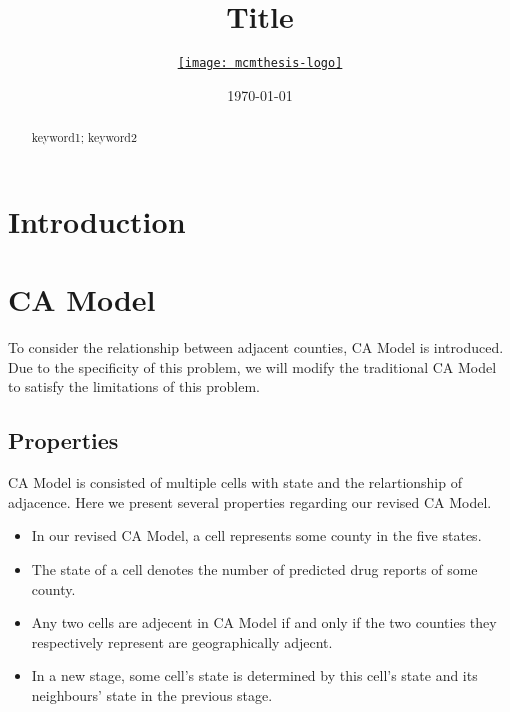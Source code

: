 \documentclass{mcmthesis}
\title{Title}
\author{\small \href{http://www.latexstudio.net/}
  {\texttt{[image: mcmthesis-logo]}}}
\date{\today}
\begin{document}
\begin{abstract}
\begin{keywords}
keyword1; keyword2
\end{keywords}
\end{abstract}
\maketitle

\tableofcontents

\newpage

\section{Introduction}



\section{CA Model}

To consider the relationship between adjacent counties, CA Model is introduced. Due to the specificity of this problem, we will modify the traditional CA Model to satisfy the limitations of this problem. \par


\subsection{Properties} %

CA Model is consisted of multiple cells with state and the relartionship of adjacence. Here we present several properties regarding our revised CA Model. 

\begin{itemize}
\item In our revised CA Model, a cell represents some county in the five states.
\item The state of a cell denotes the number of predicted drug reports of some county.
\item Any two cells are adjecent in CA Model if and only if the two counties they respectively represent are geographically adjecnt.
\item In a new stage, some cell's state is determined by this cell's state and its neighbours' state in the previous stage.
\end{itemize}
\end{document}
